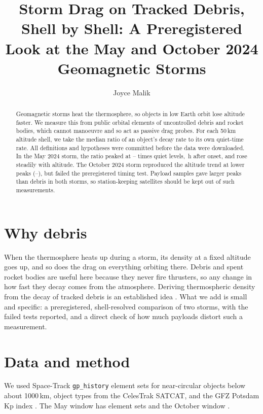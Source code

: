 \documentclass{aastex701}
\begin{document}
\title{Storm Drag on Tracked Debris, Shell by Shell: A Preregistered Look at the May and October 2024 Geomagnetic Storms}

\author[0009-0001-8293-8064]{Joyce Malik}

\begin{abstract}
Geomagnetic storms heat the thermosphere, so objects in low Earth orbit lose altitude faster. We measure this from public orbital elements of uncontrolled debris and rocket bodies, which cannot manoeuvre and so act as passive drag probes. For each 50\,km altitude shell, we take the median ratio of an object's decay rate to its own quiet-time rate. All definitions and hypotheses were committed before the data were downloaded. In the May 2024 storm, the ratio peaked at \MayPeakMin--\MayPeakMax{} times quiet levels, \MayLagFour\,h after onset, and rose steadily with altitude. The October 2024 storm reproduced the altitude trend at lower peaks (\OctPeakMin--\OctPeakMax), but failed the preregistered timing test. Payload samples gave larger peaks than debris in both storms, so station-keeping satellites should be kept out of such measurements.
\end{abstract}

\section{Why debris}
When the thermosphere heats up during a storm, its density at a fixed altitude goes up, and so does the drag on everything orbiting there. Debris and spent rocket bodies are useful here because they never fire thrusters, so any change in how fast they decay comes from the atmosphere. Deriving thermospheric density from the decay of tracked debris is an established idea \citep{Johlander2026,Constant2024}. What we add is small and specific: a preregistered, shell-resolved comparison of two storms, with the failed tests reported, and a direct check of how much payloads distort such a measurement.

\section{Data and method}
We used Space-Track \texttt{gp\_history} element sets for near-circular objects below about 1000\,km, object types from the CelesTrak SATCAT, and the GFZ Potsdam Kp index \citep{Matzka2021}. The May window has \MayNSets{} element sets and the October window \OctNSets.
\end{document}

